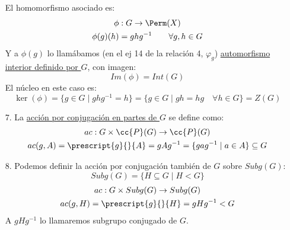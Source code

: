\begin{ejemplo}
\begin{enumerate}
            El homomorfismo asociado es:
            \begin{gather*}
                \phi:G\to\Perm(X) \\
                \phi(g)(h) = ghg^{-1} \qquad \forall g,h\in G
            \end{gather*}
            Y a $\phi(g)$ lo llamábamos (en el ej 14 de la relación 4, $\varphi_g$) \newline \underline{automorfismo interior definido por $G$}, con imagen:
            \begin{equation*}
                Im(\phi) = Int(G)
            \end{equation*}
            El núcleo en este caso es:
            \begin{equation*}
                \ker(\phi) = \{g\in G \mid ghg^{-1} = h\} = \{g\in G \mid gh = hg \quad \forall h\in G\} = Z(G)
            \end{equation*}
        \item[7.] La \underline{acción por conjugación en partes de $G$} se define como:
            \begin{gather*}
                ac:G\times \cc{P}(G) \to \cc{P}(G) \\
                ac(g,A) = \prescript{g}{}{A} = gAg^{-1} = \{gag^{-1} \mid a\in A\} \subseteq G
            \end{gather*}
        \item[8.] Podemos definir la acción por conjugación también de $G$ sobre $Subg(G)$:
            \begin{equation*}
                Subg(G) = \{H\subseteq G \mid H<G\}
            \end{equation*}
            \begin{gather*}
                ac:G\times Subg(G) \to Subg(G) \\
                ac(g,H) = \prescript{g}{}{H} = gHg^{-1} < G
            \end{gather*}
            A $gHg^{-1}$ lo llamaremos subgrupo conjugado de $G$. %
    \end{enumerate}
\end{ejemplo}
